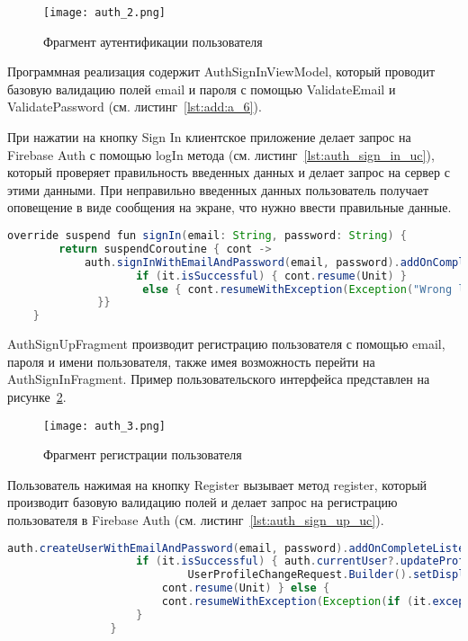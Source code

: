 \begin{figure}[H]
 \centering
   \texttt{[image: auth\_2.png]} 
   \caption{Фрагмент аутентификации пользователя}
   \label{fig:arch:auth_2}
\end{figure}

Программная реализация содержит AuthSignInViewModel, который проводит базовую валидацию полей email и пароля с помощью ValidateEmail и ValidatePassword (см. листинг~\ref{lst:add:a_6}).

При нажатии на кнопку Sign In клиентское приложение делает запрос на Firebase Auth с помощью logIn метода (см. листинг~\ref{lst:auth_sign_in_uc}), который проверяет правильность введенных данных и делает запрос на сервер с этими данными. При неправильно введенных данных пользователь получает оповещение в виде сообщения на экране, что нужно ввести правильные данные.

\begin{lstlisting}[language=Java,label={lst:auth_sign_in_uc},caption={SignIn}]
    override suspend fun signIn(email: String, password: String) {
        return suspendCoroutine { cont ->
            auth.signInWithEmailAndPassword(email, password).addOnCompleteListener {
                    if (it.isSuccessful) { cont.resume(Unit) }
                     else { cont.resumeWithException(Exception("Wrong login or password")) }
              }}
    }
\end{lstlisting}

AuthSignUpFragment производит регистрацию пользователя с помощью email, пароля и имени пользователя, также имея возможность перейти на AuthSignInFragment. Пример пользовательского интерфейса представлен на рисунке~\ref{fig:arch:auth_3}.

\begin{figure}[H]
 \centering
   \texttt{[image: auth\_3.png]} 
   \caption{Фрагмент регистрации пользователя}
   \label{fig:arch:auth_3}
\end{figure}

Пользователь нажимая на кнопку Register вызывает метод register, который производит базовую валидацию полей и делает запрос на регистрацию пользователя в Firebase Auth (см. листинг~\ref{lst:auth_sign_up_uc}).
\begin{lstlisting}[language=Java,label={lst:auth_sign_up_uc},caption={SignUp}]
auth.createUserWithEmailAndPassword(email, password).addOnCompleteListener {
                    if (it.isSuccessful) { auth.currentUser?.updateProfile(
                            UserProfileChangeRequest.Builder().setDisplayName(name).build())
                        cont.resume(Unit) } else {
                        cont.resumeWithException(Exception(if (it.exception != null) it.exception!!.message else "Wrong login or password"))
                    }
                }
\end{lstlisting}

